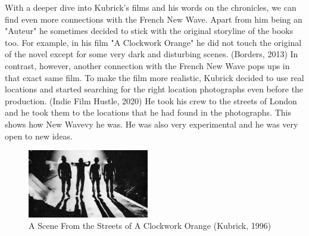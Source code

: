 \documentclass[12pt]{article}
\begin{document}
\par
With a deeper dive into Kubrick's films and his words on the chronicles, we can find even more connections with the French New Wave.
Apart from him being an "Auteur" he sometimes decided to stick with the original storyline of the books too.
For example, in his film "A Clockwork Orange" he did not touch the original of the novel except for some very dark and
disturbing scenes. (Borders, 2013) In contrast, however, another connection with the French New Wave pops ups in that exact same film.
To make the film more realistic, Kubrick decided to use real locations and started searching for the right location photographs even before the production.
(Indie Film Hustle, 2020) He took his crew to the streets of London and he took them to the locations that he had found in the photographs.
This shows how New Wavevy he was. He was also very experimental and he was very open to new ideas.
\\

\begin{figure}[h]
        \begin{center}
                \includegraphics[width=200px]{clockorange}
                \caption{A Scene From the Streets of A Clockwork Orange (Kubrick, 1996)}
        \end{center}
\end{figure}

\FloatBarrier
\end{document}
